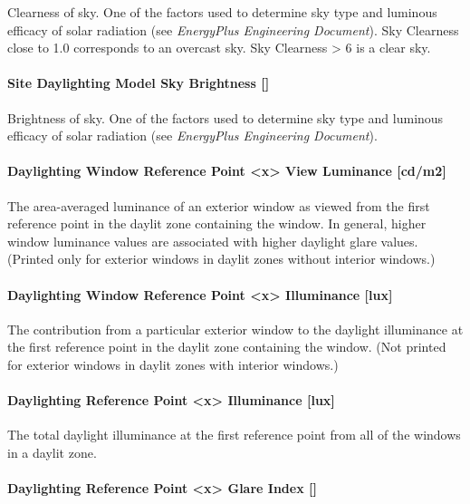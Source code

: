 Clearness of sky. One of the factors used to determine sky type and luminous efficacy of solar radiation (see \emph{EnergyPlus Engineering Document}). Sky Clearness close to 1.0 corresponds to an overcast sky. Sky Clearness \textgreater{} 6 is a clear sky.

\paragraph{Site Daylighting Model Sky Brightness {[]}}\label{site-daylighting-model-sky-brightness}

Brightness of sky. One of the factors used to determine sky type and luminous efficacy of solar radiation (see \emph{EnergyPlus Engineering Document}).

\paragraph{Daylighting Window Reference Point <x> View Luminance {[}cd/m2{]}}\label{daylighting-window-reference-point-1-view-luminance-cdm2}

The area-averaged luminance of an exterior window as viewed from the first reference point in the daylit zone containing the window. In general, higher window luminance values are associated with higher daylight glare values. (Printed only for exterior windows in daylit zones without interior windows.)

\paragraph{Daylighting Window Reference Point <x> Illuminance {[}lux{]}}\label{daylighting-window-reference-point-1-illuminance-lux}

The contribution from a particular exterior window to the daylight illuminance at the first reference point in the daylit zone containing the window. (Not printed for exterior windows in daylit zones with interior windows.)

\paragraph{Daylighting Reference Point <x> Illuminance {[}lux{]}}\label{daylighting-reference-point-1-illuminance-lux}

The total daylight illuminance at the first reference point from all of the windows in a daylit zone.

\paragraph{Daylighting Reference Point <x> Glare Index {[]}}\label{daylighting-reference-point-1-glare-index}

